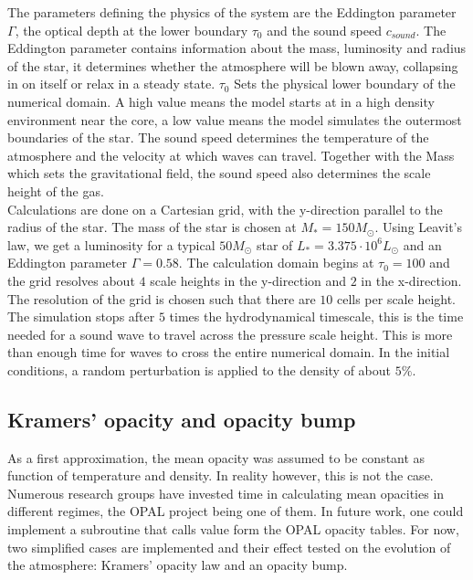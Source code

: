 The parameters defining the physics of the system are the Eddington parameter $\Gamma$, the optical depth at the lower boundary $\tau_0$ and the sound speed $c_{sound}$. The Eddington parameter contains information about the mass, luminosity and radius of the star, it determines whether the atmosphere will be blown away, collapsing in on itself or relax in a steady state. $\tau_0$ Sets the physical lower boundary of the numerical domain. A high value means the model starts at in a high density environment near the core, a low value means the model simulates the outermost boundaries of the star. The sound speed determines the temperature of the atmosphere and the velocity at which waves can travel. Together with the Mass which sets the gravitational field, the sound speed also determines the scale height of the gas. \\

Calculations are done on a Cartesian grid, with the y-direction parallel to the radius of the star. The mass of the star is chosen at $M_* = 150 M_\odot$. Using Leavit's law, we get a luminosity for a typical $50M_\odot$ star of $L_* = 3.375 \cdot 10^{6} L_\odot$ and an Eddington parameter $\Gamma = 0.58$. The calculation domain begins at $\tau_0 = 100$ and the grid resolves about $4$ scale heights in the y-direction and $2$ in the x-direction. The resolution of the grid is chosen such that there are $10$ cells per scale height. The simulation stops after $5$ times the hydrodynamical timescale, this is the time needed for a sound wave to travel across the pressure scale height. This is more than enough time for waves to cross the entire numerical domain. In the initial conditions, a random perturbation is applied to the density of about $5 \%$.\\  

\subsection{Kramers' opacity and opacity bump}
As a first approximation, the mean opacity was assumed to be constant as function of temperature and density. In reality however, this is not the case. Numerous research groups have invested time in calculating mean opacities in different regimes, the OPAL project \citep{Iglesias1996} being one of them. In future work, one could implement a subroutine that calls value form the OPAL opacity tables. For now, two simplified cases are implemented and their effect tested on the evolution of the atmosphere: Kramers' opacity law and an opacity bump.

